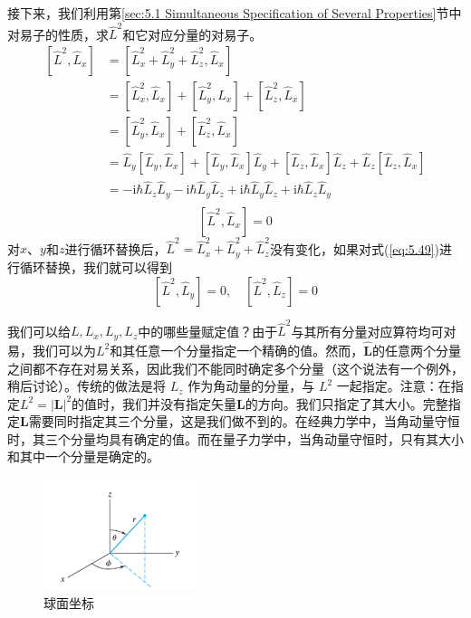     接下来，我们利用第\ref{sec:5.1 Simultaneous Specification of Several Properties}节中对易子的性质，求$\hat{L}^2$和它对应分量的对易子。
    \begin{equation*}
        \begin{aligned}
            \left[\hat{L}^2,\hat{L}_x\right] & = \left[\hat{L}_x^2+\hat{L}_y^2+\hat{L}_z^2,\hat{L}_x\right] \\
            & = \left[\hat{L}_x^2,\hat{L}_x\right] + \left[\hat{L}_y^2,\hat{L}_x\right] + \left[\hat{L}_z^2,\hat{L}_x\right] \\
            & = \left[\hat{L}_y^2,\hat{L}_x\right] + \left[\hat{L}_z^2,\hat{L}_x\right] \\
            & = \hat{L}_y\left[\hat{L}_y,\hat{L}_x\right] + \left[\hat{L}_y,\hat{L}_x\right]\hat{L}_y + \left[\hat{L}_z,\hat{L}_x\right]\hat{L}_z + \hat{L}_z\left[\hat{L}_z,\hat{L}_x\right] \\
            & = -\mathrm{i}\hbar\hat{L}_z\hat{L}_y - \mathrm{i}\hbar\hat{L}_y\hat{L}_z + \mathrm{i}\hbar\hat{L}_y\hat{L}_z + \mathrm{i}\hbar\hat{L}_z\hat{L}_y \\
        \end{aligned} 
    \end{equation*}
    \begin{equation}
        \boxed{
            \left[\hat{L}^2,\hat{L}_x\right] = 0
        }
        \label{eq:5.49}
    \end{equation}
    对$x$、$y$和$z$进行循环替换后，$\hat{L}^2 = \hat{L}_x^2 + \hat{L}_y^2 + \hat{L}_z^2$没有变化，如果对式(\ref{eq:5.49})进行循环替换，我们就可以得到
    \begin{equation}
        \boxed{
            \left[\hat{L}^2,\hat{L}_y\right] = 0, \quad \left[\hat{L}^2,\hat{L}_z\right] = 0
        }
        \label{eq:5.50}
    \end{equation}

    我们可以给$L,L_x,L_y,L_z$中的哪些量赋定值？由于$\hat{L}^2$与其所有分量对应算符均可对易，我们可以为$L^2$和其任意一个分量指定一个精确的值。然而，$\hat{\mathbf{L}}$的任意两个分量之间都不存在对易关系，因此我们不能同时确定多个分量（这个说法有一个例外，稍后讨论）。传统的做法是将 $L_z$ 作为角动量的分量，与 $L^2$ 一起指定。注意：在指定$L^2 = \left|\mathbf{L}\right|^2$的值时，我们并没有指定矢量$\mathbf{L}$的方向。我们只指定了其大小。完整指定$\mathbf{L}$需要同时指定其三个分量，这是我们做不到的。在经典力学中，当角动量守恒时，其三个分量均具有确定的值。而在量子力学中，当角动量守恒时，只有其大小和其中一个分量是确定的。
    \begin{figure}
        \centering
        \includegraphics[width=0.4\textwidth]{Figures/5.5.png}
        \caption{球面坐标}
        \label{fig:5.5}
    \end{figure}

